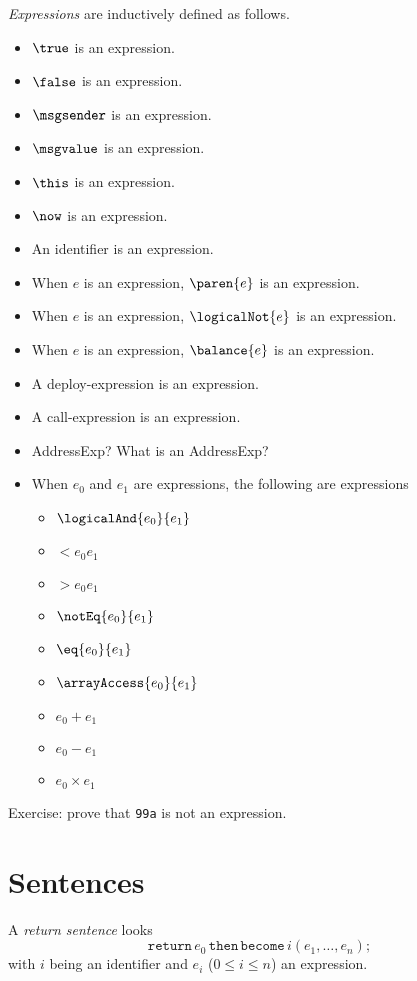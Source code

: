 \documentclass{book}
\begin{document}
\textit{Expressions} are inductively defined as follows.

\begin{itemize}
\item $\true$ is an expression.
\item $\false$ is an expression.
\item $\msgsender$ is an expression.
\item $\msgvalue$ is an expression.
\item $\this$ is an expression.
\item $\now$ is an expression.
\item An identifier is an expression.
\item When $e$ is an expression, $\paren{e}$ is an expression.
\item When $e$ is an expression, $\logicalNot{e}$ is an expression.
\item When $e$ is an expression, $\balance{e}$ is an expression.
\item A deploy-expression is an expression.
\item A call-expression is an expression.
\item AddressExp?  What is an AddressExp?
\item When $e_0$ and $e_1$ are expressions, the following are expressions
\begin{itemize}
\item $\logicalAnd{e_0}{e_1}$
\item $\lt{e_0}{e_1}$
\item $\gt{e_0}{e_1}$
\item $\notEq{e_0}{e_1}$
\item $\eq{e_0}{e_1}$
\item $\arrayAccess{e_0}{e_1}$
\item $e_0 + e_1$
\item $e_0 - e_1$
\item $e_0 \times e_1$
\end{itemize}
\end{itemize}

Exercise: prove that \texttt{99a} is not an expression.

\section{Sentences}

A \textit{return sentence} looks
\[
\texttt{return}\, e_0 \,\texttt{then}\, \texttt{become}\, i(e_1,\ldots,e_n);
\]
with $i$ being an identifier and $e_i$ ($0 \le i \le n$) an expression.
\end{document}
